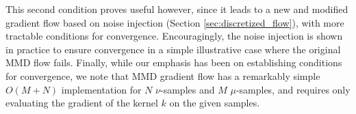 This second  condition proves useful however, since it leads to a new and modified gradient flow based on noise injection (Section \ref{sec:discretized_flow}), with more tractable
conditions for convergence. Encouragingly, the
noise injection is shown in practice to ensure convergence in a simple illustrative case where the original MMD flow fails.
Finally, while our emphasis has been on establishing conditions for convergence, we note that MMD gradient flow has a remarkably simple
$O(M+N)$ implementation for $N$ $\nu$-samples and $M$ $\mu$-samples, and requires only evaluating the gradient of the kernel $k$ on the given samples.


 

 








